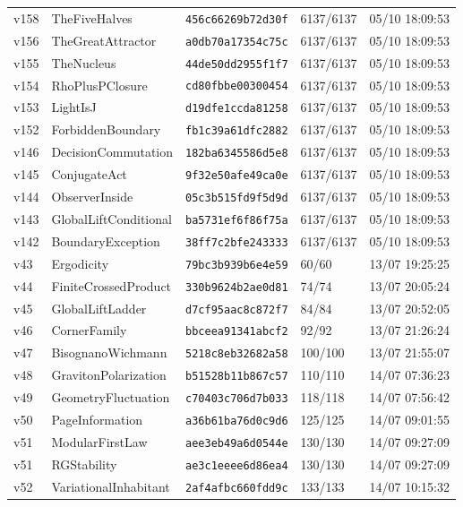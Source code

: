 \documentclass[11pt]{article}
\theoremstyle{definition}\newtheorem{deriv}{Derivação}
\begin{document}
{\begin{longtable}{@{}lllll@{}}
v158 & TheFiveHalves & \texttt{456c66269b72d30f} & 6137/6137 & 05/10 18:09:53 \\
v156 & TheGreatAttractor & \texttt{a0db70a17354c75c} & 6137/6137 & 05/10 18:09:53 \\
v155 & TheNucleus & \texttt{44de50dd2955f1f7} & 6137/6137 & 05/10 18:09:53 \\
v154 & RhoPlusPClosure & \texttt{cd80fbbe00300454} & 6137/6137 & 05/10 18:09:53 \\
v153 & LightIsJ & \texttt{d19dfe1ccda81258} & 6137/6137 & 05/10 18:09:53 \\
v152 & ForbiddenBoundary & \texttt{fb1c39a61dfc2882} & 6137/6137 & 05/10 18:09:53 \\
v146 & DecisionCommutation & \texttt{182ba6345586d5e8} & 6137/6137 & 05/10 18:09:53 \\
v145 & ConjugateAct & \texttt{9f32e50afe49ca0e} & 6137/6137 & 05/10 18:09:53 \\
v144 & ObserverInside & \texttt{05c3b515fd9f5d9d} & 6137/6137 & 05/10 18:09:53 \\
v143 & GlobalLiftConditional & \texttt{ba5731ef6f86f75a} & 6137/6137 & 05/10 18:09:53 \\
v142 & BoundaryException & \texttt{38ff7c2bfe243333} & 6137/6137 & 05/10 18:09:53 \\
v43 & Ergodicity & \texttt{79bc3b939b6e4e59} & 60/60 & 13/07 19:25:25 \\
v44 & FiniteCrossedProduct & \texttt{330b9624b2ae0d81} & 74/74 & 13/07 20:05:24 \\
v45 & GlobalLiftLadder & \texttt{d7cf95aac8c872f7} & 84/84 & 13/07 20:52:05 \\
v46 & CornerFamily & \texttt{bbceea91341abcf2} & 92/92 & 13/07 21:26:24 \\
v47 & BisognanoWichmann & \texttt{5218c8eb32682a58} & 100/100 & 13/07 21:55:07 \\
v48 & GravitonPolarization & \texttt{b51528b11b867c57} & 110/110 & 14/07 07:36:23 \\
v49 & GeometryFluctuation & \texttt{c70403c706d7b033} & 118/118 & 14/07 07:56:42 \\
v50 & PageInformation & \texttt{a36b61ba76d0c9d6} & 125/125 & 14/07 09:01:55 \\
v51 & ModularFirstLaw & \texttt{aee3eb49a6d0544e} & 130/130 & 14/07 09:27:09 \\
v51 & RGStability & \texttt{ae3c1eeee6d86ea4} & 130/130 & 14/07 09:27:09 \\
v52 & VariationalInhabitant & \texttt{2af4afbc660fdd9c} & 133/133 & 14/07 10:15:32 \\

\end{longtable}}
\end{document}
